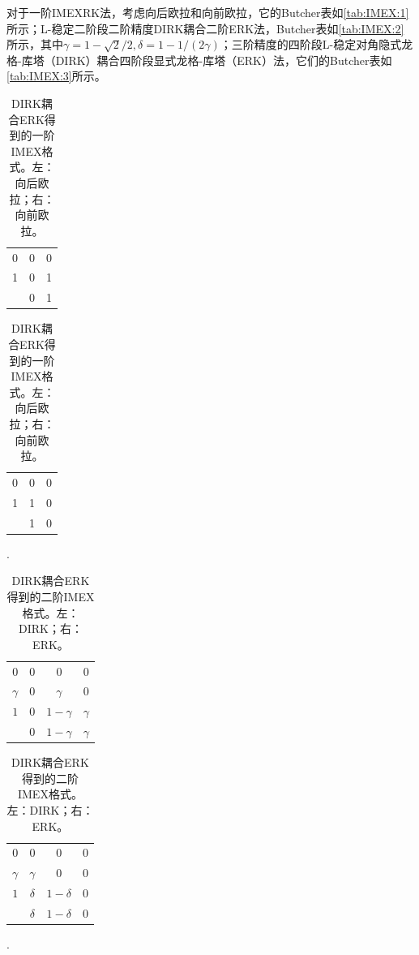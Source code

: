 对于一阶IMEXRK法，考虑向后欧拉和向前欧拉\cite{ascher1997implicitexplicita}，它的Butcher表如\autoref{tab:IMEX:1}所示；L-稳定二阶段二阶精度DIRK耦合二阶ERK法\cite{ascher1997implicitexplicita}，Butcher表如\autoref{tab:IMEX:2}所示，其中$\gamma=1- \sqrt{2}/2,\delta = 1- 1/(2\gamma)$；三阶精度的四阶段L-稳定对角隐式龙格-库塔（DIRK）耦合四阶段显式龙格-库塔（ERK）法\cite{ascher1997implicitexplicita}，它们的Butcher表如\autoref{tab:IMEX:3}所示。
\begin{table}
	\centering
	\begin{minipage}{0.45\linewidth}
		\centering
		\begin{tabular}{c|cc}
			0 & 0 & 0 \\
			1 & 0 & 1 \\
			\hline
			  & 0 & 1
		\end{tabular}
	\end{minipage}
	\begin{minipage}{0.45\linewidth}
		\centering
		\begin{tabular}{c|cc}
			0 & 0 & 0 \\
			1 & 1 & 0 \\
			\hline
			  & 1 & 0
		\end{tabular}.
	\end{minipage}
	\caption{DIRK耦合ERK得到的一阶IMEX格式。左：向后欧拉；右：向前欧拉。}
	\label{tab:IMEX:1}
\end{table}
\begin{table}
	\centering
	\begin{minipage}{0.45\linewidth}
		\centering
		\begin{tabular}{c|ccc}
			0        & 0 & 0          & 0        \\
			$\gamma$ & 0 & $\gamma$   & $0$      \\
			$1$      & 0 & $1-\gamma$ & $\gamma$ \\
			\hline
			         & 0 & $1-\gamma$ & $\gamma$
		\end{tabular}
	\end{minipage}
	\begin{minipage}{0.45\linewidth}
		\centering
		\begin{tabular}{c|ccc}
			0        & 0        & 0           & 0 \\
			$\gamma$ & $\gamma$ & $0$         & 0 \\
			$1$      & $\delta$ & $1- \delta$ & 0 \\
			\hline
			         & $\delta$ & $1-\delta$  & 0
		\end{tabular}.
	\end{minipage}
	\caption{DIRK耦合ERK得到的二阶IMEX格式。左：DIRK；右：ERK。}
	\label{tab:IMEX:2}
\end{table}



